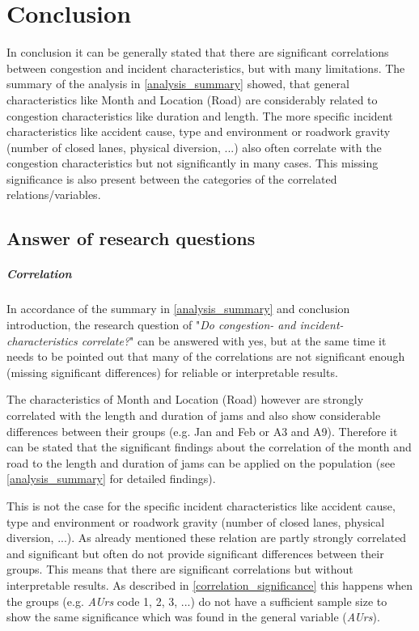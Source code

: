 \chapter{Conclusion}
In conclusion it can be generally stated that there are significant correlations between congestion and incident characteristics, but with many limitations. The summary of the analysis in \cref{analysis_summary} showed, that general characteristics like Month and Location (Road) are considerably related to congestion characteristics like duration and length. The more specific incident characteristics like accident cause, type and environment or roadwork gravity (number of closed lanes, physical diversion, ...) also often correlate with the congestion characteristics but not significantly in many cases. This missing significance is also present between the categories of the correlated relations/variables.

\section{Answer of research questions}
\paragraph{Correlation}
In accordance of the summary in \cref{analysis_summary} and conclusion introduction, the research question of "\textit{Do congestion- and incident-characteristics correlate?}" can be answered with yes, but at the same time it needs to be pointed out that many of the correlations are not significant enough (missing significant differences) for reliable or interpretable results.

The characteristics of Month and Location (Road) however are strongly correlated with the length and duration of jams and also show considerable differences between their groups (e.g. Jan and Feb or A3 and A9). Therefore it can be stated that the significant findings about the correlation of the month and road to the length and duration of jams can be applied on the population (see \cref{analysis_summary} for detailed findings).

This is not the case for the specific incident characteristics like accident cause, type and environment or roadwork gravity (number of closed lanes, physical diversion, ...). As already mentioned these relation are partly strongly correlated and significant but often do not provide significant differences between their groups. This means that there are significant correlations but without interpretable results. As described in \cref{correlation_significance} this happens when the groups (e.g. \textit{AUrs} code 1, 2, 3, ...) do not have a sufficient sample size to show the same significance which was found in the general variable (\textit{AUrs}).

